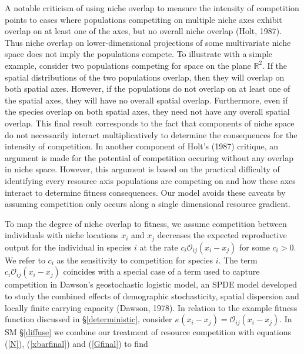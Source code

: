 \documentclass[]{elsarticle} %
\begin{document}
A notable criticism of using niche overlap to measure the intensity of
competition points to cases where populations competiting on multiple
niche axes exhibit overlap on at least one of the axes, but no overall
niche overlap (Holt, 1987). Thus niche overlap on lower-dimensional
projections of some multivariate niche space does not imply the
populations compete. To illustrate with a simple example, consider two
populations competing for space on the plane \(\mathbb{R}^2\). If the
spatial distributions of the two populations overlap, then they will
overlap on both spatial axes. However, if the populations do not overlap
on at least one of the spatial axes, they will have no overall spatial
overlap. Furthermore, even if the species overlap on both spatial axes,
they need not have any overall spatial overlap. This final result
corresponds to the fact that components of niche space do not
necessarily interact multiplicatively to determine the consequences for
the intensity of competition. In another component of Holt's (1987)
critique, an argument is made for the potential of competition occuring
without any overlap in niche space. However, this argument is based on
the practical difficulty of identifying every resource axis populations
are competing on and how these axes interact to determine fitness
consequences. Our model avoids these caveats by assuming competition
only occurs along a single dimensional resource gradient.

To map the degree of niche overlap to fitness, we assume competition
between individuals with niche locations \(x_i\) and \(x_j\) decreases
the expected reproductive output for the individual in species \(i\) at
the rate \(c_i\mathcal{O}_{ij}(x_i-x_j)\) for some \(c_i>0\). We refer
to \(c_i\) as the sensitivity to competition for species \(i\). The term
\(c_i\mathcal{O}_{ij}(x_i-x_j)\) coincides with a special case of a term
used to capture competition in Dawson's geostochastic logistic model, an
SPDE model developed to study the combined effects of demographic
stochasticity, spatial dispersion and locally finite carrying capacity
(Dawson, 1978). In relation to the example fitness function discussed in
\S\ref{deterministic}, consider
\(\kappa(x_i-x_j)=\mathcal{O}_{ij}(x_i-x_j)\). In SM \S\ref{diffuse} we
combine our treatment of resource competition with equations (\ref{N}),
(\ref{xbarfinal}) and (\ref{Gfinal}) to find
\end{document}

